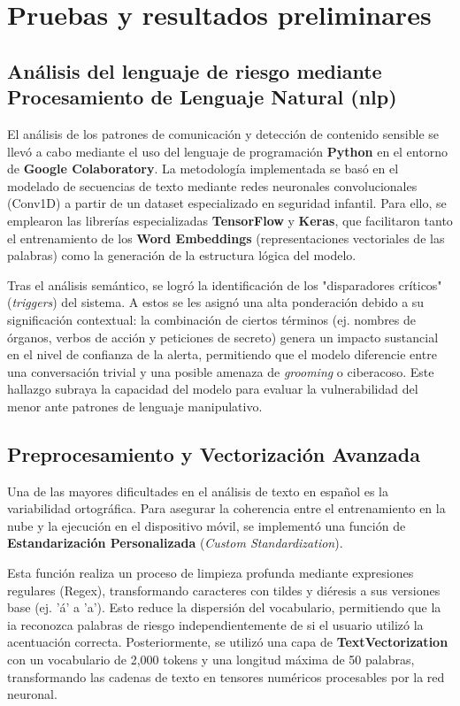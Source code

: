 \section{Pruebas y resultados preliminares}

\subsection{Análisis del lenguaje de riesgo mediante Procesamiento de Lenguaje Natural (\gls{nlp})}
El análisis de los patrones de comunicación y detección de contenido sensible se llevó a cabo mediante el uso del lenguaje de programación \textbf{Python} en el entorno de \textbf{Google Colaboratory}. La metodología implementada se basó en el modelado de secuencias de texto mediante redes neuronales convolucionales (Conv1D) a partir de un dataset especializado en seguridad infantil. Para ello, se emplearon las librerías especializadas \textbf{TensorFlow} y \textbf{Keras}, que facilitaron tanto el entrenamiento de los \textbf{Word Embeddings} (representaciones vectoriales de las palabras) como la generación de la estructura lógica del modelo.

Tras el análisis semántico, se logró la identificación de los "disparadores críticos" (\textit{triggers}) del sistema. A estos se les asignó una alta ponderación debido a su significación contextual: la combinación de ciertos términos (ej. nombres de órganos, verbos de acción y peticiones de secreto) genera un impacto sustancial en el nivel de confianza de la alerta, permitiendo que el modelo diferencie entre una conversación trivial y una posible amenaza de \textit{grooming} o ciberacoso. Este hallazgo subraya la capacidad del modelo para evaluar la vulnerabilidad del menor ante patrones de lenguaje manipulativo.

\subsection{Preprocesamiento y Vectorización Avanzada}
Una de las mayores dificultades en el análisis de texto en español es la variabilidad ortográfica. Para asegurar la coherencia entre el entrenamiento en la nube y la ejecución en el dispositivo móvil, se implementó una función de \textbf{Estandarización Personalizada} (\textit{Custom Standardization}).

Esta función realiza un proceso de limpieza profunda mediante expresiones regulares (Regex), transformando caracteres con tildes y diéresis a sus versiones base (ej. 'á' a 'a'). Esto reduce la dispersión del vocabulario, permitiendo que la \gls{ia} reconozca palabras de riesgo independientemente de si el usuario utilizó la acentuación correcta. Posteriormente, se utilizó una capa de \textbf{TextVectorization} con un vocabulario de 2,000 tokens y una longitud máxima de 50 palabras, transformando las cadenas de texto en tensores numéricos procesables por la red neuronal.

